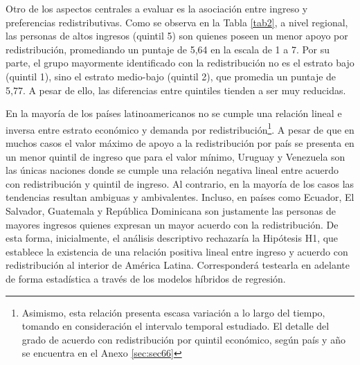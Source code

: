 \documentclass[12pt,letterpaper]{article}
\begin{document}
Otro de los aspectos centrales a evaluar es la asociación entre ingreso y preferencias redistributivas. Como se observa en la Tabla \ref{tab2}, a nivel regional, las personas de altos ingresos (quintil 5) son quienes poseen un menor apoyo por redistribución, promediando un puntaje de 5,64 en la escala de 1 a 7. Por su parte, el grupo mayormente identificado con la redistribución no es el estrato bajo (quintil 1), sino el estrato medio-bajo (quintil 2), que promedia un puntaje de 5,77. A pesar de ello, las diferencias entre quintiles tienden a ser muy reducidas.

En la mayoría de los países latinoamericanos no se cumple una relación lineal e inversa entre estrato económico y demanda por redistribución\footnote{Asimismo, esta relación presenta escasa variación a lo largo del tiempo, tomando en consideración el intervalo temporal estudiado. El detalle del grado de acuerdo con redistribución por quintil económico, según país y año se encuentra en el Anexo \ref{sec:sec66}}. A pesar de que en muchos casos el valor máximo de apoyo a la redistribución por país se presenta en un menor quintil de ingreso que para el valor mínimo, Uruguay y Venezuela son las únicas naciones donde se cumple una relación negativa lineal entre acuerdo con redistribución y quintil de ingreso. Al contrario, en la mayoría de los casos las tendencias resultan ambiguas y ambivalentes. Incluso, en países como Ecuador, El Salvador, Guatemala y República Dominicana son justamente las personas de mayores ingresos quienes expresan un mayor acuerdo con la redistribución. De esta forma, inicialmente, el análisis descriptivo rechazaría la Hipótesis H1, que establece la existencia de una relación positiva lineal entre ingreso y acuerdo con redistribución al interior de América Latina. Corresponderá testearla en adelante de forma estadística a través de los modelos híbridos de regresión.
\end{document}
